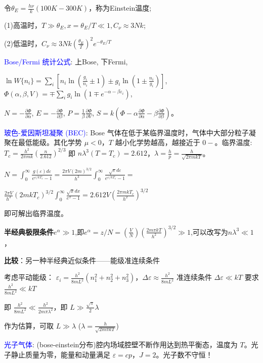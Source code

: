 \documentclass[a4paper,8pt]{extarticle} %
\newcommand{\bluetext}[1]{\textcolor{blue}{#1}}
\begin{document}
\begin{multicols}{3}
令$\theta_E = \frac{h\nu}{k}(100K-300K)$，称为Einstein温度;

(1)高温时，$T \gg \theta_E, x=\theta_E/T \ll 1, C_\nu \approx 3Nk$;

(2)低温时，$C_\nu \approx 3Nk(\frac{\theta_E}{T})^2e^{-\theta_E/T}$

\bluetext{Bose/Fermi 统计公式}: 上Bose, 下Fermi,

$\ln W\{n_i\} = \sum_i \left[n_i\ln\left(\frac{g_i}{n_i} \pm 1 \right) \pm g_i\ln\left(1 \pm \frac{n_i}{g_i}\right)\right]$,
$\Phi(\alpha,\beta,V) = \mp \sum_i g_i\ln\left(1 \mp e^{-\alpha-\beta\varepsilon_i}\right)$,

$N = -\frac{\partial\Phi}{\partial\alpha}$, $E = -\frac{\partial\Phi}{\partial\beta}$, $P = \frac{1}{\beta}\frac{\partial\Phi}{\partial V}$, $S = k\left(\Phi - \alpha\frac{\partial\Phi}{\partial\alpha} - \beta\frac{\partial\Phi}{\partial\beta}\right)$。

\bluetext{玻色-爱因斯坦凝聚 (BEC)}: Bose 气体在低于某临界温度时，气体中大部分粒子凝聚在最低能级。其化学势 $\mu < 0$，$T$ 越小化学势越高，越接近于 $0-$。临界温度: $T_c = \frac{h^2}{2\pi mk}\left(\frac{n}{2.612}\right)^{2/3}$ 即 $n\lambda^3(T=T_c) = 2.612$，$\lambda = \frac{h}{p} = \frac{h}{\sqrt{2\pi mkT}}$。

$N = \int_0^{\infty}\frac{g(\varepsilon)d\varepsilon}{e^{\varepsilon/kT_c}-1} = \frac{2\pi V(2m)^{3/2}}{h^3}\int_0^{\infty}\frac{\sqrt{\varepsilon}d\varepsilon}{e^{\varepsilon/kT_c}-1}=$

$\frac{2\pi V}{h^3}(2mkT_c)^{3/2}\int_0^{\infty}\frac{\sqrt{x}dx}{e^x-1} = 2.612V\left(\frac{2\pi mkT_c}{h^2}\right)^{3/2}$

即可解出临界温度。

\textbf{半经典极限条件}$e^{\alpha} \gg 1$,即$e^\alpha = z/N =(\frac{V}{N})(\frac{2m\pi kT}{h^2})^{3/2} \gg 1$,可以改写为$n\lambda^3 \ll 1$，

\textbf{比较}：另一种半经典近似条件——能级准连续条件

考虑平动能级：
$\varepsilon_i = \frac{h^2}{8mL^2}(n_1^2 + n_2^2 + n_3^2)$，$\Delta\varepsilon \approx \frac{h^2}{8mL^2}$
准连续条件 $\Delta\varepsilon \ll kT$ 要求 $\frac{h^2}{8mL^2} \ll kT$

即 $\frac{h^2}{8mL^2} \ll \frac{h^2}{2m\pi\lambda^2}$，即 $L \gg \frac{\sqrt{\pi}}{2}\lambda$

作为估算，可取 $L \gg \lambda$ ($\lambda = \frac{h}{\sqrt{2m\pi kT}}$)

\bluetext{光子气体}: (bose-einstein分布)腔内场域腔壁不断作用达到热平衡态，温度为 $T$。光子静止质量为零，能量和动量满足 $\varepsilon = cp$，$J = 2$。光子数不守恒！


\end{multicols}
\end{document}
